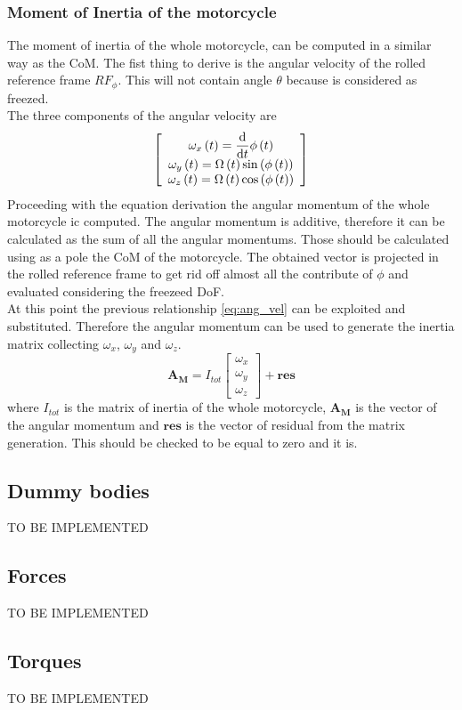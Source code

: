 \subsubsection{Moment of Inertia of the motorcycle}
%
The moment of inertia of the whole motorcycle, can be computed in a similar way as the CoM.
The fist thing to derive is the angular velocity of the rolled reference frame $RF_\phi$. This will not contain angle $\theta$ because is considered as freezed.\\
The three components of the angular velocity are 
%
\begin{equation}
    \label{eq:ang_vel}
\left[ \begin {array}{c} 
\displaystyle \omega_{x} \left( t \right) ={\frac {\rm d}{
{\rm d}t}}\phi \left( t \right) \\
\displaystyle \omega_{y} \left( t \right) =\Omega \left( t \right) \sin \left( \phi \left( t
 \right)  \right) \\ 
 \displaystyle \omega_{z} \left( t \right) =\Omega \left( t \right) \cos \left( \phi \left( t \right)  \right) 
\end {array} \right] 
\end{equation}
%
Proceeding with the equation derivation the angular momentum of the whole motorcycle ic computed. The angular momentum is additive, therefore it can be calculated as the sum of all the angular momentums. Those should be calculated using as a pole the CoM of the motorcycle. The obtained vector is projected in the rolled reference frame to get rid off almost all the contribute of 
$\phi$ and evaluated considering the freezeed DoF.\\
At this point the previous relationship \ref{eq:ang_vel} can be exploited and substituted. Therefore the angular momentum can be used to generate the inertia matrix collecting $\omega_{x}$, $\omega_{y}$ and $\omega_{z}$.
%
\begin{equation}
    \mathbf{A_M} = I_{tot} 
    \left[ \begin{array}{l}
        \omega_x\\
        \omega_y\\
        \omega_z
    \end{array} \right]
    + \mathbf{res}
\end{equation}
%
where $I_{tot}$ is the matrix of inertia of the whole motorcycle, $\mathbf{A_M}$ is the vector of the angular momentum and $\mathbf{res}$ is the vector of residual from the matrix generation. This should be checked to be equal to zero and it is.
%
\subsection{Dummy bodies}
%
TO BE IMPLEMENTED 
%
\subsection{Forces}
%
TO BE IMPLEMENTED 
%
\subsection{Torques}
%
TO BE IMPLEMENTED 
%